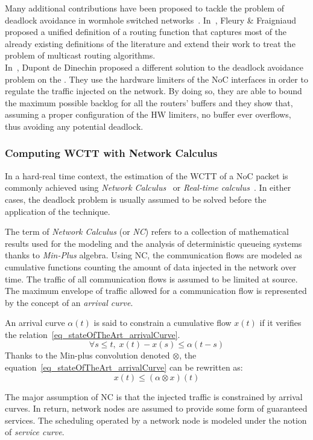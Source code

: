 \documentclass[main.tex]{subfiles}
\begin{document}
Many additional contributions have been proposed to tackle the problem of
deadlock avoidance in wormhole switched networks~\cite{Jayasimha2003, Lin1991,
Schwiebert1995}. In~\cite{Fleury98}, Fleury \& Fraigniaud proposed a unified
definition of a routing function that captures most of the already existing
definitions of the literature and extend their work to treat the problem of
multicast routing algorithms. \\

In~\cite{Dinechin2014NoCArc}, Dupont de Dinechin \etal proposed a different
solution to the deadlock avoidance problem on the \mppalong. They use the
hardware limiters of the NoC interfaces in order to regulate the traffic
injected on the network. By doing so, they are able to bound the maximum
possible backlog for all the routers' buffers and they show that, assuming a
proper configuration of the HW limiters, no buffer ever overflows, thus
avoiding any potential deadlock.\\



\subsubsection{Computing WCTT with Network Calculus}

In a hard-real time context, the estimation of the WCTT of a NoC packet is
commonly achieved using \emph{Network Calculus}~\cite{LeBoudec2001, Cruz91} or
\emph{Real-time calculus}~\cite{Thiele2000}. In either cases, the deadlock
problem is usually assumed to be solved before the application of the
technique.


The term of \emph{Network Calculus} (or \emph{NC}) refers to a collection of
mathematical results used for the modeling and the analysis of deterministic
queueing systems thanks to \emph{Min-Plus} algebra. Using NC, the communication
flows are modeled as cumulative functions counting the amount of data injected
in the network over time. The traffic of all communication flows is assumed to
be limited at source. The maximum envelope of traffic allowed for a
communication flow is represented by the concept of an \emph{arrival curve}.

\begin{definition}
    An arrival curve $\alpha(t)$ is said to constrain a cumulative flow $x(t)$
    if it verifies the relation~\ref{eq_stateOfTheArt_arrivalCurve}.
    \begin{equation}
        \label{eq_stateOfTheArt_arrivalCurve}
        \forall s \leq t, \;  x(t) - x(s) \leq \alpha(t-s)
    \end{equation}
    Thanks to the Min-plus convolution denoted $\otimes$, the
    equation~\ref{eq_stateOfTheArt_arrivalCurve} can be rewritten as:
    \begin{displaymath}
        x(t) \leq ( \alpha \otimes x ) (t)
    \end{displaymath}
\end{definition}
The major assumption of NC is that the  injected traffic is constrained by
arrival curves. In return, network nodes are assumed to provide some form of
guaranteed services. The scheduling operated by a network node is modeled under
the notion of \emph{service curve}. 
\end{document}
